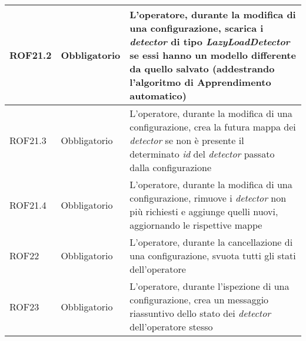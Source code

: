 {\begin{longtable}{L{3cm} L{3cm} L{7.5cm}}
\hline
ROF21.2 & Obbligatorio & L'operatore, durante la modifica di una configurazione, scarica i \textit{detector} di tipo \textit{LazyLoadDetector} se essi hanno un modello differente da quello salvato (addestrando l'algoritmo di \gls{Apprendimento automatico}) \\
\hline
ROF21.3 & Obbligatorio & L'operatore, durante la modifica di una configurazione, crea la futura mappa dei \textit{detector} se non è presente il determinato \textit{id} del \textit{detector} passato dalla configurazione\\
\hline
ROF21.4 & Obbligatorio & L'operatore, durante la modifica di una configurazione, rimuove i \textit{detector} non più richiesti e aggiunge quelli nuovi, aggiornando le rispettive mappe\\
\hline
ROF22 & Obbligatorio & L'operatore, durante la cancellazione di una configurazione, svuota tutti gli stati dell'operatore\\
\hline
ROF23 & Obbligatorio & L'operatore, durante l'ispezione di una configurazione, crea un messaggio riassuntivo dello stato dei \textit{detector} dell'operatore stesso\\
\hline
\end{longtable}
}


